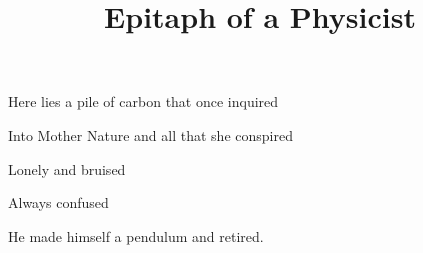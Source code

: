 \documentclass{article}
\title{Epitaph of a Physicist}
\begin{document}
 \newline

Here lies a pile of carbon that once inquired \newline

Into Mother Nature and all that she conspired \newline

Lonely and bruised \newline

Always confused \newline

He made himself a pendulum and retired.
\end{document}
